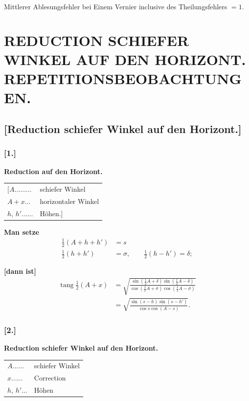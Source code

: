 \documentclass[12pt,a4paper]{article}
\DeclareMathOperator{\tang}{tang}
\theoremstyle{plain}
\theoremstyle{definition}
\theoremstyle{remark}
\begin{document}
\bigskip
\noindent
Mittlerer Ablesungsfehler bei Einem Vernier inclusive des Theilungsfehlers $= 1$.

\newpage
\section*{REDUCTION SCHIEFER WINKEL AUF DEN HORIZONT.\\REPETITIONSBEOBACHTUNGEN.}

\subsection*{[Reduction schiefer Winkel auf den Horizont.]}

\subsubsection*{[1.]}

\textbf{Reduction auf den Horizont.}

\begin{tabular}{ll}
$[A \ldots\ldots\ldots$ & schiefer Winkel \\
$A + x \ldots$ & horizontaler Winkel \\
$h$, $h' \ldots\ldots$ & Höhen.]
\end{tabular}

\bigskip
\noindent
\textbf{Man setze}
\begin{align*}
\tfrac12(A + h + h') &= s \\
\tfrac12(h + h') &= \sigma, \qquad \tfrac12(h - h') = \delta;
\end{align*}

\noindent
\textbf{[dann ist]}
\begin{align*}
\tang\tfrac12(A+x) &= \sqrt{\frac{\sin(\frac12 A + \delta)\sin(\frac12 A - \delta)}{\cos(\frac12 A + \sigma)\cos(\frac12 A - \sigma)}} \\
&= \sqrt{\frac{\sin(s-h)\sin(s-h')}{\cos s \cos(A-s)}}.
\end{align*}

\subsubsection*{[2.]}

\textbf{Reduction schiefer Winkel auf den Horizont.}

\begin{tabular}{ll}
$A \ldots\ldots$ & schiefer Winkel \\
$x \ldots\ldots$ & Correction \\
$h$, $h' \ldots$ & Höhen
\end{tabular}
\end{document}
